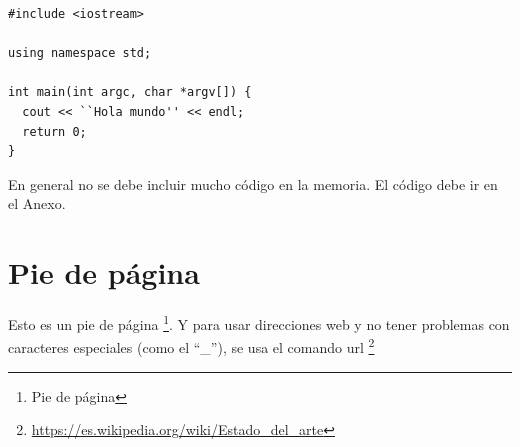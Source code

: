 \lstset{numbers=left,numberstyle=\tiny, language=C, breaklines=true, basicstyle=\footnotesize, xleftmargin=25pt, framesep=8pt, numbersep=15pt}


\begin{lstlisting}[frame=leftline, caption={Hola Mundo}, label=code:prog1]
#include <iostream> 

using namespace std;

int main(int argc, char *argv[]) {
  cout << ``Hola mundo'' << endl;
  return 0;
}
\end{lstlisting}


En general no se debe incluir mucho código en la memoria. El código debe ir en el Anexo. 

\section{Pie de página}

Esto es un pie de página \footnote{Pie de página}. Y para usar direcciones web y no tener problemas con caracteres especiales (como el ``\_''), se usa el comando url \footnote{\url{https://es.wikipedia.org/wiki/Estado_del_arte}}
